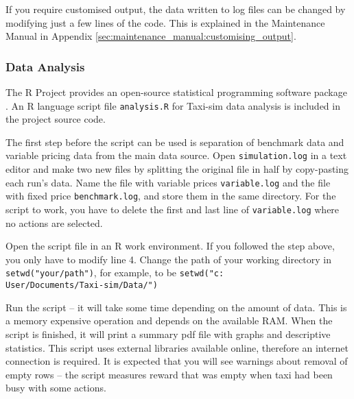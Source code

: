 If you require customised output, the data written to log files can be changed
by modifying just a few lines of the code. This is explained in the Maintenance
Manual in Appendix \ref{sec:maintenance_manual:customising_output}.


\subsubsection{Data Analysis}
\label{sec:user_manual:using:data}


The R Project provides an open-source statistical programming software package
\parencite{Rlang}. An R language script file \texttt{analysis.R} for Taxi-sim
data analysis is included in the project source code.

The first step before the script can be used is separation of benchmark data
and variable pricing data from the main data source. Open
\texttt{simulation.log} in a text editor and make two new files by splitting
the original file in half by copy-pasting each run's data. Name the file with
variable prices \texttt{variable.log} and the file with fixed price
\texttt{benchmark.log}, and store them in the same directory. For the script to
work, you have to delete the first and last line of \texttt{variable.log} where
no actions are selected.

Open the script file in an R work environment. If you followed the step above,
you only have to modify line 4. Change the path of your working directory in
\texttt{setwd("your/path")}, for example, to be
\texttt{setwd("c:\\User/Documents/Taxi-sim/Data/")} 

Run the script -- it will take some time depending on the amount of data. This
is a memory expensive operation and depends on the available RAM. When the
script is finished, it will print a summary pdf file with graphs and
descriptive statistics. This script uses external libraries available online,
therefore an internet connection is required. It is expected that you will see
warnings about removal of empty rows -- the script measures reward that was
empty when taxi had been busy with some actions.

